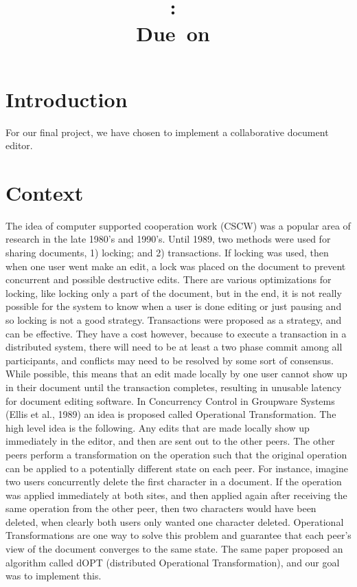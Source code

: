 \documentclass{article}
\title{
	\vspace{2in}
	\textmd{\textbf{\hmwkClass:\ \hmwkTitle}}\\
	\normalsize\vspace{0.1in}\small{Due\ on\ \hmwkDueDate}\\
	\vspace{0.1in}\large{\textit{\hmwkClassInstructor}}
}
\author{\hmwkAuthorName}
\date{}
\begin{document}
\maketitle

\pagebreak

\section{Introduction}
For our final project, we have chosen to implement a collaborative document editor.

\section{Context}
The idea of computer supported cooperation work (CSCW) was a popular area of research in the late 1980's and 1990's. Until 1989, two methods were used for sharing documents, 1) locking; and 2) transactions. If locking was used, then when one user went make an edit, a lock was placed on the document to prevent concurrent and possible destructive edits. There are various optimizations for locking, like locking only a part of the document, but in the end, it is not really possible for the system to know when a user is done editing or just pausing and so locking is not a good strategy. Transactions were proposed as a strategy, and can be effective. They have a cost however, because to execute a transaction in a distributed system, there will need to be at least a two phase commit among all participants, and conflicts may need to be resolved by some sort of consensus. While possible, this means that an edit made locally by one user cannot show up in their document until the transaction completes, resulting in unusable latency for document editing software. In Concurrency Control in Groupware Systems (Ellis et al., 1989) an idea is proposed called Operational Transformation. The high level idea is the following. Any edits that are made locally show up immediately in the editor, and then are sent out to the other peers. The other peers perform a transformation on the operation such that the original operation can be applied to a potentially different state on each peer. For instance, imagine two users concurrently delete the first character in a document. If the operation was applied immediately at both sites, and then applied again after receiving the same operation from the other peer, then two characters would have been deleted, when clearly both users only wanted one character deleted. Operational Transformations are one way to solve this problem and guarantee that each peer's view of the document converges to the same state. The same paper proposed an algorithm called dOPT (distributed Operational Transformation), and our goal was to implement this.\\
\end{document}
